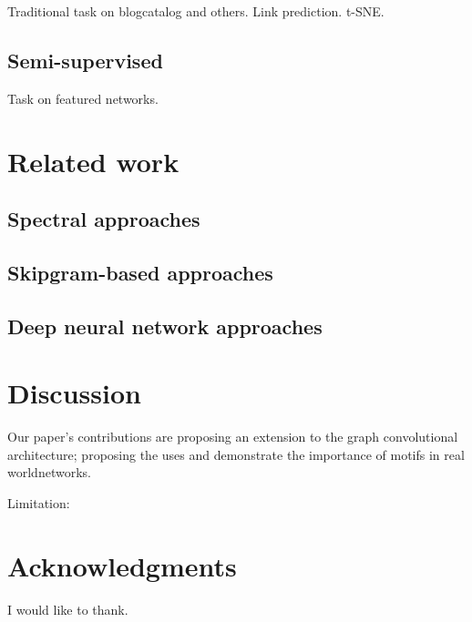 \documentclass{article}
\theoremstyle{definition}
\begin{document}
Traditional task on blogcatalog and others.
Link prediction.
t-SNE.

\subsection{Semi-supervised}

Task on featured networks.

\section{Related work}

\subsection{Spectral approaches}

\subsection{Skipgram-based approaches }

\subsection{Deep neural network approaches}

\section{Discussion}

Our paper's contributions are proposing an extension to the graph convolutional 
architecture; proposing the uses and demonstrate the importance of motifs in
real worldnetworks.

Limitation: 


\section*{Acknowledgments}

I would like to thank.



\end{document}
